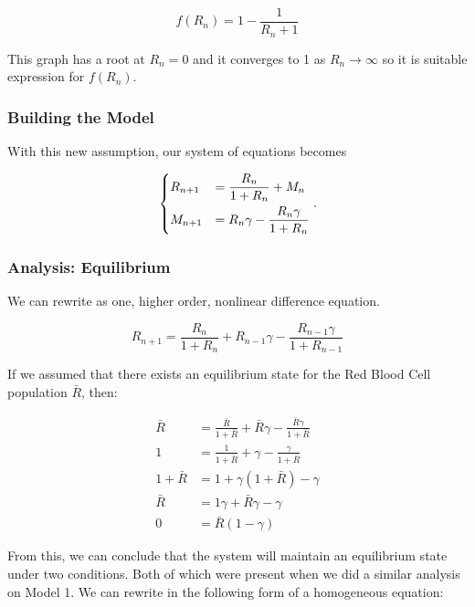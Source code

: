 \begin{equation*}
    f(R_n) = 1 - \frac{1}{R_n+1}
\end{equation*}

This graph has a root at $R_n=0$ and it converges to 1 as $R_n\to\infty$ so it is suitable expression for $f(R_n)$.

\subsubsection{Building the Model}

With this new assumption, our system of equations becomes

\begin{equation}
    \begin{dcases}
        R_{n+1} &= \frac{R_n}{1 + R_n} + M_n\\
        M_{n+1} &= R_n\gamma-\frac{R_n\gamma}{1+R_n}
    \end{dcases}.
    \label{eq:nonlinear-difference-model-system}
\end{equation}

\subsubsection{Analysis: Equilibrium}

We can rewrite  as one, higher order, nonlinear difference equation.

\begin{equation}
    R_{n+1} = \frac{R_n}{1 + R_n} + R_{n-1}\gamma-\frac{R_{n-1}\gamma}{1+R_{n-1}}
    \label{eq:nonlinear-difference-model-equation}
\end{equation}

If we assumed that there exists an equilibrium state for the Red Blood Cell population $\bar{R}$, then:

\begin{align*}
     \bar{R} &= \frac{\bar{R}}{1 + \bar{R}} + \bar{R}\gamma - \frac{\bar{R}\gamma}{1+\bar{R}}\\
     1 &= \frac{1}{1 + \bar{R}} + \gamma - \frac{\gamma}{1+\bar{R}}\\
     1 + \bar{R} &= 1 + \gamma(1 + \bar{R}) - \gamma\\
     \bar{R} &= 1\gamma + \bar{R}\gamma - \gamma\\
     0 &= \bar{R}(1-\gamma)
\end{align*}

From this, we can conclude that the system will maintain an equilibrium state under two conditions. Both of which were present when we did a similar analysis on Model 1. We can rewrite  in the following form of a homogeneous equation:

